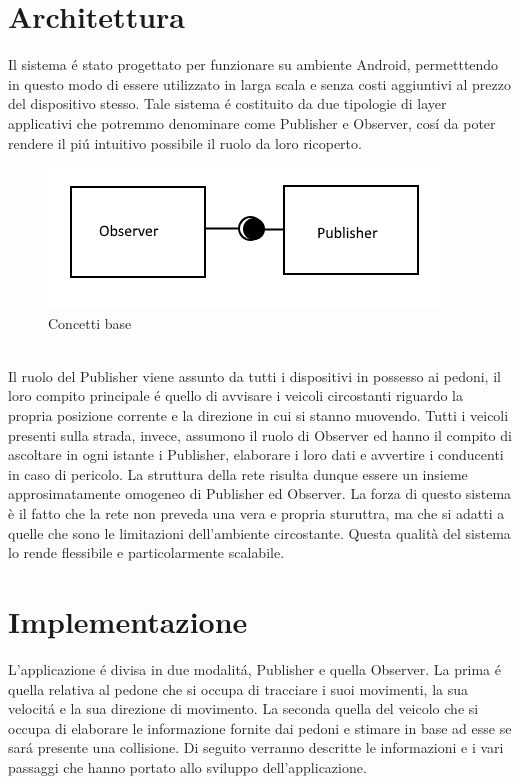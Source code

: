 \documentclass[conference]{IEEEtran}
\begin{document}
\section{Architettura}
Il sistema \'e stato progettato per funzionare su ambiente Android, permetttendo in questo modo di essere utilizzato in larga scala e senza costi aggiuntivi al prezzo del dispositivo stesso. Tale sistema \'e costituito da due tipologie di layer applicativi che potremmo denominare come Publisher e Observer, cos\'i da poter rendere il pi\'u intuitivo possibile il ruolo da loro ricoperto.
\begin{figure}[ht!]
	\centering
	\includegraphics[width=0.7\linewidth]{ps}
	\caption{Concetti base}
	\label{fig:ps}
\end{figure}
\\
Il ruolo del Publisher viene assunto da tutti i dispositivi in possesso ai pedoni, il loro compito principale \'e quello di avvisare i veicoli circostanti riguardo la propria posizione corrente e la direzione in cui si stanno muovendo. Tutti i veicoli presenti sulla strada, invece, assumono il ruolo di Observer ed hanno il compito di ascoltare in ogni istante i Publisher, elaborare i loro dati e avvertire i conducenti in caso di pericolo. La struttura della rete risulta dunque essere un insieme approsimatamente omogeneo di Publisher ed Observer. La forza di questo sistema è il fatto che la rete non preveda una vera e propria sturuttra, ma che si adatti a quelle che sono le limitazioni dell'ambiente circostante. Questa qualità del sistema lo rende flessibile e particolarmente scalabile.

\section{Implementazione}
L'applicazione \'e divisa in due modalit\'a, Publisher e quella Observer. La prima \'e quella relativa al pedone che si occupa di tracciare i suoi movimenti, la sua velocit\'a e la sua direzione di movimento. La seconda quella del veicolo che si occupa di elaborare le informazione fornite dai pedoni e stimare in base ad esse se sar\'a presente una collisione. Di seguito verranno descritte le informazioni e i vari passaggi che hanno portato allo sviluppo dell'applicazione.
\end{document}
